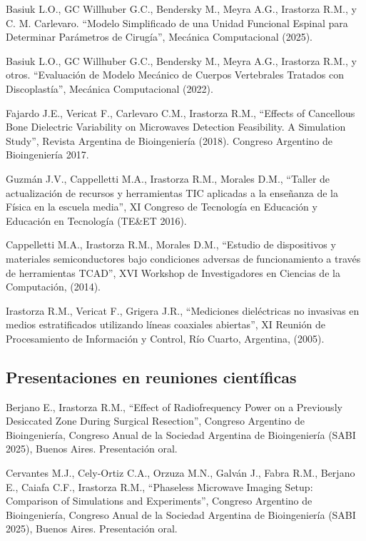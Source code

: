 \documentclass[margin,line]{res}
\begin{document}
\begin{resume}
Basiuk L.O., GC Willhuber G.C., Bendersky M., Meyra A.G., Irastorza R.M., y C. M. Carlevaro. ``Modelo Simplificado de una Unidad Funcional Espinal para Determinar Parámetros de Cirugía'', Mecánica Computacional (2025).

Basiuk L.O., GC Willhuber G.C., Bendersky M., Meyra A.G., Irastorza R.M., y otros. ``Evaluación de Modelo Mecánico de Cuerpos Vertebrales Tratados con Discoplastía'', Mecánica Computacional (2022).

Fajardo J.E., Vericat F., Carlevaro C.M., Irastorza R.M., ``Effects of Cancellous Bone Dielectric Variability on Microwaves Detection Feasibility. A Simulation Study'', Revista Argentina de Bioingeniería  (2018). Congreso Argentino de Bioingeniería 2017.

Guzmán J.V., Cappelletti M.A., Irastorza R.M., Morales D.M., ``Taller de actualización de recursos y herramientas TIC aplicadas a la enseñanza de la Física en la escuela media'', XI Congreso de Tecnología en Educación y Educación en Tecnología (TE\&ET 2016).

Cappelletti M.A., Irastorza R.M., Morales D.M., ``Estudio de dispositivos y materiales semiconductores bajo condiciones adversas de funcionamiento a través de herramientas TCAD'', XVI Workshop de Investigadores en Ciencias de la Computación, (2014).

Irastorza R.M., Vericat F., Grigera J.R., ``Mediciones dieléctricas no invasivas en medios estratificados utilizando líneas coaxiales abiertas'', XI Reunión de Procesamiento de Información y Control, Río Cuarto, Argentina, (2005).

\subsection{ Presentaciones en reuniones científicas}



Berjano E., Irastorza R.M., ``Effect of Radiofrequency Power on a Previously Desiccated Zone During Surgical Resection'', Congreso Argentino de Bioingeniería,  Congreso Anual de la Sociedad Argentina de Bioingeniería (SABI 2025), Buenos Aires. Presentación oral.

Cervantes M.J., Cely-Ortiz C.A., Orzuza M.N., Galván J., Fabra R.M., Berjano E., Caiafa C.F., Irastorza R.M., ``Phaseless Microwave Imaging Setup: Comparison of Simulations and Experiments'', Congreso Argentino de Bioingeniería,  Congreso Anual de la Sociedad Argentina de Bioingeniería (SABI 2025), Buenos Aires. Presentación oral.


\end{resume}
\end{document}

